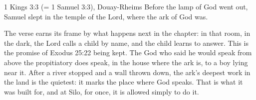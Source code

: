 \begin{witnessbox}{1 Kings 3:3 (= 1 Samuel 3:3), Douay-Rheims}
Before the lamp of God went out, Samuel slept in the temple of the Lord,
where the ark of God was.
\end{witnessbox}

The verse earns its frame by what happens next in the chapter: in that room,
in the dark, the Lord calls a child by name, and the child learns to answer.
This is the promise of Exodus 25:22 being kept. The God who said he would
speak from above the propitiatory does speak, in the house where the ark is,
to a boy lying near it. After a river stopped and a wall thrown down, the
ark's deepest work in the land is the quietest: it marks the place where God
speaks. That is what it was built for, and at Silo, for once, it is allowed
simply to do it.


